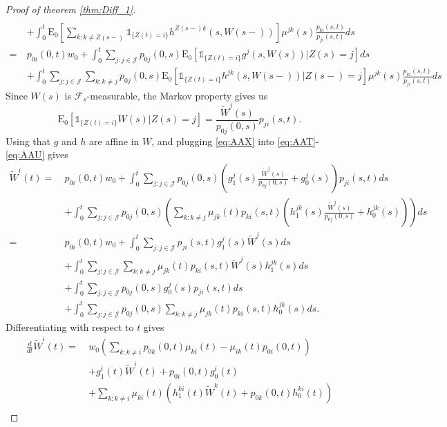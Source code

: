 \documentclass[12pt]{article}
\newcommand{\E}{\text{E}}
\newcommand{\indic}[1]{\mathds{1}_{ \{ #1 \} }}
\theoremstyle{my_thm}
\theoremstyle{my_rem}
\begin{document}
\begin{proof}[Proof of theorem \ref{thm:Diff_1}]
\begin{align}
\\
&+
\nonumber \int_0^t \E_0 \left[ \sum_{k:k \neq Z(s-)}  \indic{Z(t)=i} h^{Z(s-)k}(s,W(s-))\right] \mu^{jk}(s) \frac{p_{ki}(s,t)}{p_{ji}(s,t)}  ds
\\
= \ &
p_{0i}(0,t)w_0+
 \int_0^t \sum_{j:j \in \mathcal{J}} p_{0j}(0,s) \E_0 \left[ \indic{Z(t)=i} g^{j}(s,W(s))|Z(s)=j \right] ds \label{eq:AAT}
\\
&+
 \int_0^t  \sum_{j:j \in \mathcal{J}}  \sum_{k:k \neq j} p_{0j}(0,s) \E_0 \left[ \indic{Z(t)=i} h^{jk}(s,W(s-)) | Z(s-)=j \right] \mu^{jk}(s) \frac{p_{ki}(s,t)}{p_{ji}(s,t)}   ds \label{eq:AAU}
\end{align}
Since $W(s)$ is $\mathcal{F}_s$-measurable, the Markov property gives us
\begin{equation}
\E_0[\indic{Z(t)=i}W(s)|Z(s)=j]=\frac{\tilde{W}^j(s)}{p_{0j}(0,s)}p_{ji}(s,t). \label{eq:AAX}
\end{equation}
Using that $g$ and $h$ are affine in $W$, and plugging \eqref{eq:AAX} into \eqref{eq:AAT}-\eqref{eq:AAU} gives
\begin{align*}
\tilde{W}^i(t)= \ &p_{0i}(0,t)w_0+
\int_0^t \sum_{j:j \in \mathcal{J}} p_{0j}(0,s)\left(  g_1^j(s)\frac{\tilde{W}^j(s)}{p_{0j}(0,s)}+g^j_0(s)\right)p_{ji}(s,t) ds
\\
&+
\int_0^t \sum_{j:j \in \mathcal{J}} p_{0j}(0,s)  \left( \sum_{k:k \neq j}  \mu_{jk}(t)p_{ki}(s,t) \left(  h_1^{jk}(s) \frac{\tilde{W}^j(s)}{p_{0j}(0,s)} +h_0^{jk}(s)  \right) \right) ds
 \\
= \ &p_{0i}(0,t)w_0+
\int_0^t \sum_{j:j \in \mathcal{J}} p_{ji}(s,t) g_1^j(s) \tilde{W}^j(s) ds
\\
&+
\int_0^t \sum_{j:j \in \mathcal{J}} \sum_{k:k \neq j}  \mu_{jk}(t) p_{ki}(s,t) \tilde{W}^j(s) h^{jk}_1(s)  ds
\\
&+
\int_0^t \sum_{j:j \in \mathcal{J}} p_{0j}(0,s)g_0^j(s)p_{ji}(s,t) ds
\\
&+
\int_0^t \sum_{j:j \in \mathcal{J}} p_{0j}(0,s)  \sum_{k:k \neq j}  \mu_{jk}(t) p_{ki}(s,t)h^{jk}_0(s) ds.
\end{align*}
Differentiating with respect to $t$ gives
\begin{align*}
\frac{d}{dt}\tilde{W}^i(t)= \ &
w_0
\left(\sum_{k:k \neq i} p_{0k}(0,t)\mu_{ki}(t) - \mu_{ik}(t)p_{0i}(0,t)\right)
\\
&+
 g_1^i(t) \tilde{W}^i(t) +p_{0i}(0,t)g^i_0(t)\\
&+
\sum_{k:k \neq i} \mu_{ki}(t) \left(  h_1^{ki}(t) \tilde{W}^k(t) + p_{0k}(0,t)h^{ki}_0(t) \right)
\\

\end{align*}
\end{proof}
\end{document}
